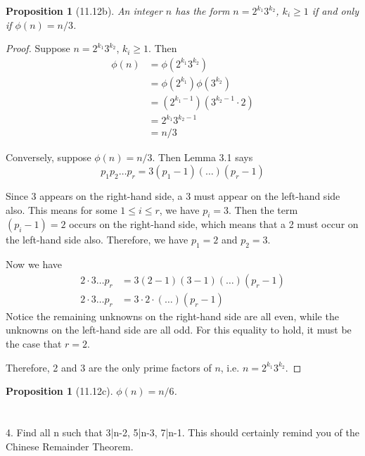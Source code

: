 \documentclass[letterpaper, 12pt, oneside]{memoir}
\theoremstyle{mystyle}
\newtheorem{prop}[thm]{Proposition}
\begin{document}
\begin{prop}[11.12b]
    An integer $n$ has the form $n=2^{k_1} 3^{k_2}$, $k_i \geq 1$ if and only if 
    $\phi(n) = n/3$.
\end{prop}
\begin{proof}
    Suppose $n = 2^{k_1} 3^{k_2}$, $k_i \geq 1$. Then
    \begin{align*}
        \phi(n) &= \phi(2^{k_1} 3^{k_2}) \\
                &= \phi(2^{k_1}) \phi(3^{k_2}) \\
                &= (2^{k_1 - 1})(3^{k_2 - 1} \cdot 2) \\
                &= 2^{k_1} 3^{k_2 - 1} \\
                &= n/3
    \end{align*}
    
    Conversely, suppose $\phi(n) = n/3$. Then Lemma 3.1 says
    \[ p_1 p_2 \ldots p_r = 3 (p_1 - 1)(\ldots)(p_r - 1) \]
    
    Since 3 appears on the right-hand side, a 3 must appear on the left-hand 
    side also. This means for some $1 \leq i \leq r$, we have $p_i = 3$. Then
    the term $(p_i - 1) = 2$ occurs on the right-hand side, which means that
    a 2 must occur on the left-hand side also. Therefore, we have $p_1 = 2$ and
    $p_2 = 3$.
    
    Now we have
    \begin{align*}
    2 \cdot 3 \ldots p_r &= 3 (2 - 1)(3-1)(\ldots)(p_r - 1) \\
    2 \cdot 3 \ldots p_r &= 3 \cdot 2 \cdot (\ldots)(p_r - 1)
    \end{align*}
    Notice the remaining unknowns on the right-hand side are all even, while
    the unknowns on the left-hand side are all odd. For this equality to hold, 
    it must be the case that $r = 2$.
    
    Therefore, 2 and 3 are the only prime factors of $n$, i.e. 
    $n=2^{k_1} 3^{k_2}$.
\end{proof}


\begin{prop}[11.12c]
    $\phi(n) = n/6$.
\end{prop}

\section{} 
4. Find all n such that  3|n-2, 5|n-3, 7|n-1. This should certainly remind you of the Chinese Remainder Theorem. 
\end{document}
